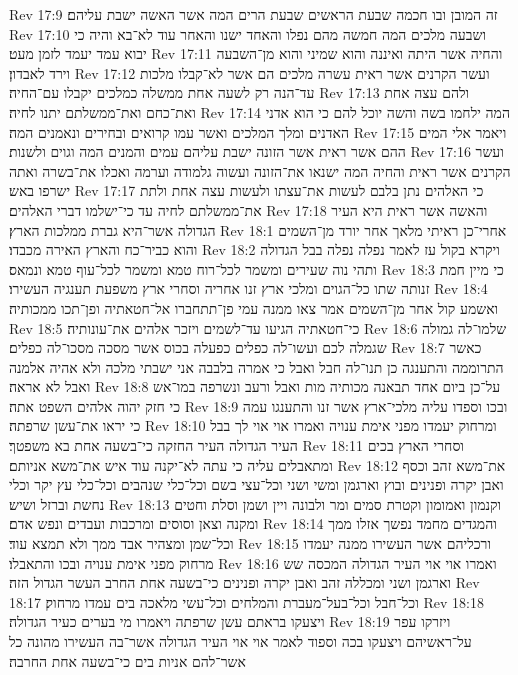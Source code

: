 Rev 17:9  זה המובן ובו חכמה שבעת הראשים שבעת הרים המה אשר האשה ישבת עליהם׃
Rev 17:10  ושבעה מלכים המה חמשה מהם נפלו והאחד ישנו והאחר עוד לא־בא והיה כי יבוא עמד יעמד לזמן מעט׃
Rev 17:11  והחיה אשר היתה ואיננה והוא שמיני והוא מן־השבעה וירד לאבדון׃
Rev 17:12  ועשר הקרנים אשר ראית עשרה מלכים הם אשר לא־קבלו מלכות עד־הנה רק לשעה אחת ממשלה כמלכים יקבלו עם־החיה׃
Rev 17:13  ולהם עצה אחת ואת־כחם ואת־ממשלתם יתנו לחיה׃
Rev 17:14  המה ילחמו בשה והשה יוכל להם כי הוא אדני האדנים ומלך המלכים ואשר עמו קרואים ובחירים ונאמנים המה׃
Rev 17:15  ויאמר אלי המים ההם אשר ראית אשר הזונה ישבת עליהם עמים והמנים המה וגוים ולשנות׃
Rev 17:16  ועשר הקרנים אשר ראית והחיה המה ישנאו את־הזונה ועשוה גלמודה וערמה ואכלו את־בשרה ואתה ישרפו באש׃
Rev 17:17  כי האלהים נתן בלבם לעשות את־עצתו ולעשות עצה אחת ולתת את־ממשלתם לחיה עד כי־ישלמו דברי האלהים׃
Rev 17:18  והאשה אשר ראית היא העיר הגדולה אשר־היא גברת ממלכות הארץ׃
Rev 18:1  אחרי־כן ראיתי מלאך אחר יורד מן־השמים והוא כביר־כח והארץ האירה מכבדו׃
Rev 18:2  ויקרא בקול עז לאמר נפלה נפלה בבל הגדולה ותהי נוה שעירים ומשמר לכל־רוח טמא ומשמר לכל־עוף טמא ונמאס׃
Rev 18:3  כי מיין חמת זנותה שתו כל־הגוים ומלכי ארץ זנו אחריה וסחרי ארץ משפעת תענגיה העשירו׃
Rev 18:4  ואשמע קול אחר מן־השמים אמר צאו ממנה עמי פן־תתחברו אל־חטאתיה ופן־תכו ממכותיה׃
Rev 18:5  כי־חטאתיה הגיעו עד־לשמים ויזכר אלהים את־עונותיה׃
Rev 18:6  שלמו־לה גמולה שגמלה לכם ועשו־לה כפלים כפעלה בכוס אשר מסכה מסכו־לה כפלים׃
Rev 18:7  כאשר התרוממה והתענגה כן תנו־לה חבל ואבל כי אמרה בלבבה אני ישבתי מלכה ולא אהיה אלמנה ואבל לא אראה׃
Rev 18:8  על־כן ביום אחד תבאנה מכותיה מות ואבל ורעב ונשרפה במו־אש כי חזק יהוה אלהים השפט אתה׃
Rev 18:9  ובכו וספדו עליה מלכי־ארץ אשר זנו והתענגו עמה כי יראו את־עשן שרפתה׃
Rev 18:10  ומרחוק יעמדו מפני אימת ענויה ואמרו אוי אוי לך בבל העיר הגדולה העיר החזקה כי־בשעה אחת בא משפטך׃
Rev 18:11  וסחרי הארץ בכים ומתאבלים עליה כי עתה לא־יקנה עוד איש את־משא אניותם׃
Rev 18:12  את־משא זהב וכסף ואבן יקרה ופנינים ובוץ וארגמן ומשי ושני וכל־עצי בשם וכל־כלי שנהבים וכל־כלי עץ יקר וכלי נחשת וברזל ושיש׃
Rev 18:13  וקנמון ואמומון וקטרת סמים ומר ולבונה ויין ושמן וסלת וחטים ומקנה וצאן וסוסים ומרכבות ועבדים ונפש אדם׃
Rev 18:14  והמגדים מחמד נפשך אזלו ממך וכל־שמן ומצהיר אבד ממך ולא תמצא עוד׃
Rev 18:15  ורכליהם אשר העשירו ממנה יעמדו מרחוק מפני אימת ענויה ובכו והתאבלו׃
Rev 18:16  ואמרו אוי אוי העיר הגדולה המכסה שש וארגמן ושני ומכללה זהב ואבן יקרה ופנינים כי־בשעה אחת החרב העשר הגדול הזה׃
Rev 18:17  וכל־חבל וכל־בעל־מעברת והמלחים וכל־עשי מלאכה בים עמדו מרחוק׃
Rev 18:18  ויצעקו בראתם עשן שרפתה ויאמרו מי בערים כעיר הגדולה׃
Rev 18:19  ויזרקו עפר על־ראשיהם ויצעקו בכה וספוד לאמר אוי אוי העיר הגדולה אשר־בה העשירו מהונה כל אשר־להם אניות בים כי־בשעה אחת החרבה׃
